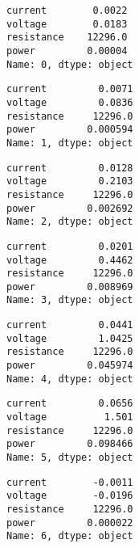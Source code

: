 \documentclass[11pt]{article}
\begin{document}
    
    \begin{Verbatim}[commandchars=\\\{\}]
current        0.0022
voltage        0.0183
resistance    12296.0
power         0.00004
Name: 0, dtype: object
    \end{Verbatim}

    
    
    \begin{Verbatim}[commandchars=\\\{\}]
current         0.0071
voltage         0.0836
resistance     12296.0
power         0.000594
Name: 1, dtype: object
    \end{Verbatim}

    
    
    \begin{Verbatim}[commandchars=\\\{\}]
current         0.0128
voltage         0.2103
resistance     12296.0
power         0.002692
Name: 2, dtype: object
    \end{Verbatim}

    
    
    \begin{Verbatim}[commandchars=\\\{\}]
current         0.0201
voltage         0.4462
resistance     12296.0
power         0.008969
Name: 3, dtype: object
    \end{Verbatim}

    
    
    \begin{Verbatim}[commandchars=\\\{\}]
current         0.0441
voltage         1.0425
resistance     12296.0
power         0.045974
Name: 4, dtype: object
    \end{Verbatim}

    
    
    \begin{Verbatim}[commandchars=\\\{\}]
current         0.0656
voltage          1.501
resistance     12296.0
power         0.098466
Name: 5, dtype: object
    \end{Verbatim}

    
    
    \begin{Verbatim}[commandchars=\\\{\}]
current        -0.0011
voltage        -0.0196
resistance     12296.0
power         0.000022
Name: 6, dtype: object
    \end{Verbatim}
\end{document}
